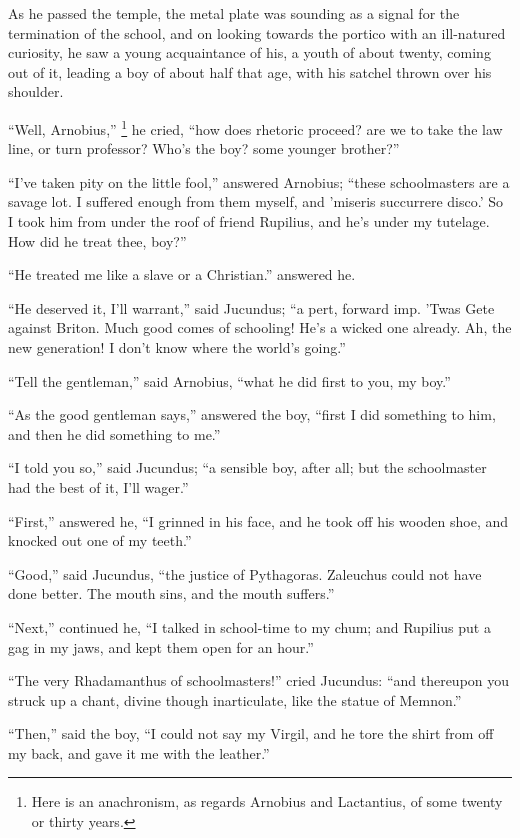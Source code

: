 As he passed the temple, the metal plate was sounding as a signal
for the termination of the school, and on looking towards the portico
with an ill-natured curiosity, he saw a young acquaintance of his, a
youth of about twenty, coming out of it, leading a boy of about half
that age, with his satchel thrown over his shoulder.

``Well, Arnobius,'' \footnote{Here is an anachronism, as regards Arnobius and Lactantius, of some
twenty or thirty years.}
he cried, ``how does rhetoric proceed? are we to take the law
line, or turn professor? Who's the boy? some younger brother?''

``I've taken pity on the little fool,'' answered Arnobius;
``these schoolmasters are a savage lot. I suffered enough from
them myself, and 'miseris succurrere disco.' So I took him from
under the roof of friend Rupilius, and he's under my tutelage. How did
he treat thee, boy?''

``He treated me like a slave or a Christian.'' answered he.

``He deserved it, I'll warrant,'' said Jucundus; ``a
pert, forward imp. 'Twas Gete against Briton. Much good comes of
schooling! He's a wicked one already. Ah, the new generation! I don't
know where the world's going.''

``Tell the gentleman,'' said Arnobius, ``what he did
first to you, my boy.''

``As the good gentleman says,'' answered the boy,
``first I did something to him, and then he did something to
me.''

``I told you so,'' said Jucundus; ``a sensible boy,
after all; but the schoolmaster had the best of it, I'll wager.''

``First,'' answered he, ``I grinned in his face, and he
took off his wooden shoe, and knocked out one of my teeth.''

``Good,'' said Jucundus, ``the justice of Pythagoras.
Zaleuchus could not have done better. The mouth sins, and the mouth
suffers.''

``Next,'' continued he, ``I talked in school-time to my
chum; and Rupilius put a gag in my jaws, and kept them open for an
hour.''

``The very Rhadamanthus of schoolmasters!'' cried Jucundus:
``and thereupon you struck up a chant, divine though inarticulate,
like the statue of Memnon.''

``Then,'' said the boy, ``I could not say my Virgil,
and he tore the shirt from off my back, and gave it me with the
leather.''

